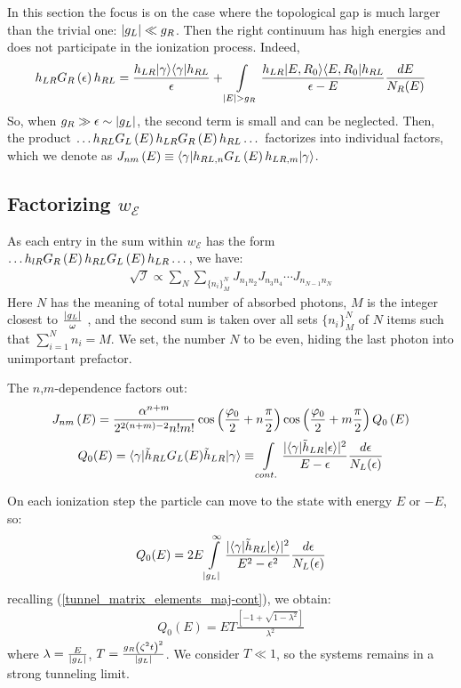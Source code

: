 In this section the focus is on the case where the topological gap is much larger than the trivial one: $ \left|g_L\right|\ll g_R $. Then the right continuum has high energies and does not participate in the ionization process. Indeed,
\begin{gather}
	h_{LR} G_R\br{\epsilon} h_{RL}
	=
	\frac{h_{LR}|\gamma\rangle\langle\gamma|h_{RL}}{\epsilon}
	+
	\intop_{|E|>g_{R}}
	\frac{h_{LR}|E,R_0\rangle\langle E,R_0|h_{RL}}{\epsilon-E}\frac{dE}{N_{R}(E)}
\end{gather}
So, when $ g_{R}\gg\epsilon\sim \left|g_L\right| $, the second term is small and can be neglected. Then, the product $ \dots h_{RL}G_L\left(E\right)h_{LR}G_R\left(E\right)h_{RL}\dots $ factorizes into individual factors, which we denote as $ J_{nm}\left(E\right)\equiv\langle\gamma|h_{RL,n}G_L\left(E\right)h_{LR,m}|\gamma\rangle $.

\subsection{Factorizing $ w_\mathcal{E} $}
\label{sect:factorizeing_w}

As each entry in the sum within $ w_{\mathcal{E}} $ has the form $ \dots h_{lR}G_R\left(E\right)h_{RL}G_L\left(E\right)h_{LR}\dots $, we have:
\begin{gather}
	\sqrt{\mathcal{I}}\propto
	\sum_N \sum_{\{n_i\}_M^N}
	J_{n_1 n_{2}}
	J_{n_3 n_{4}}
	\cdots
	J_{n_{N-1}n_{N}}
\end{gather}
Here $ N $ has the meaning of total number of absorbed photons, $ M $ is the integer closest to $ \frac{\left|g_L\right|}{\omega }$ , and the second sum is taken over all sets $ \{n_i\}_M^N $ of $ N $ items such that $ \sum_{i=1}^N n_{i} = M$. We set, the number $ N $ to be even, hiding the last photon into unimportant prefactor.

 The $ n $,$ m $-dependence factors out:
\begin{gather}
J_{nm}\left(E\right)
=
	\frac{\alpha^{n+m}}
	{2^{2\left(n+m\right)-2}n!m!}
	\cos\left(\frac{\varphi_{0}}{2}+n\frac{\pi}{2}\right)
	\cos\left(\frac{\varphi_{0}}{2}+m\frac{\pi}{2}\right)
	Q_0\left(E\right)
\end{gather}
\begin{gather}
	Q_{0}(E)
	=
	\langle\gamma|\tilde{h}_{RL}G_L(E)\tilde{h}_{LR}|\gamma\rangle
	\equiv
	\intop_{cont.}\frac{|\langle\gamma|\tilde{h}_{LR}|\epsilon\rangle|^{2}}{E-\epsilon}\frac{d\epsilon}{N_L(\epsilon)}
\end{gather}

On each ionization step  the particle can move to the state with energy $ E $ or $ -E $, so:
\begin{gather}
	Q_{0}(E)
	=
	2E\intop_{|g_{L}|}^{\infty}\frac{|\langle\gamma|\tilde{h}_{RL}|\epsilon\rangle|^{2}}{E^{2}-\epsilon^{2}}\frac{d\epsilon}{N_L(\epsilon)}
\end{gather}
recalling (\ref{tunnel_matrix_elements_maj-cont}), we obtain:
\begin{gather}
		Q_{0}(E)
		=
		ET\frac{\left[-1+\sqrt{1-\lambda^{2}}\right]}{\lambda^{2}}
\end{gather}
where $ \lambda = \frac{E}{\left|g_L\right|} $, $ T=\frac{g_R\left(\zeta^2t\right)^2}{\left|g_L\right|} $. We consider $ T\ll 1$, so the systems remains in a strong tunneling limit.


